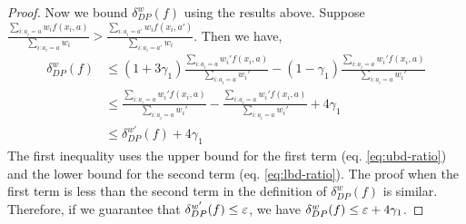 \begin{proof}
Now we bound $\delta^w_{DP}(f)$ using the results above. Suppose $\frac{\sum_{i: a_i = a} w_i f(x_i,a)}{\sum_{i: a_i = a} w_i} >  \frac{\sum_{i: a_i = a'} w_i f(x_i,a')}{\sum_{i: a_i = a'} w_i}$. Then we have,
\begin{align*}
\delta^w_{DP}(f) &\le (1+3\gamma_1)  \frac{\sum_{i: a_i = a} w_i' f(x_i,a)}{\sum_{i: a_i = a} w_i'} - (1-\gamma_1) \frac{\sum_{i: a_i = a} w_i' f(x_i,a)}{\sum_{i: a_i = a} w_i'}  \\
&\le  \frac{\sum_{i: a_i = a} w_i' f(x_i,a)}{\sum_{i: a_i = a} w_i'} -  \frac{\sum_{i: a_i = a} w_i' f(x_i,a)}{\sum_{i: a_i = a} w_i'} + 4\gamma_1\\
&\le \delta^{w'}_{DP}(f) + 4\gamma_1
\end{align*}
The first inequality uses the upper bound for the first term (eq. \ref{eq:ubd-ratio}) and the lower bound for the second term (eq. \ref{eq:lbd-ratio}). The proof when the first term is less than the second term in the definition of $\delta^w_{DP}(f)$ is similar. Therefore, if we guarantee that $\delta^{w'}_{DP}(f) \le \varepsilon$, we have $\delta^w_{DP}(f) \le \varepsilon+4\gamma_1$.
\end{proof}